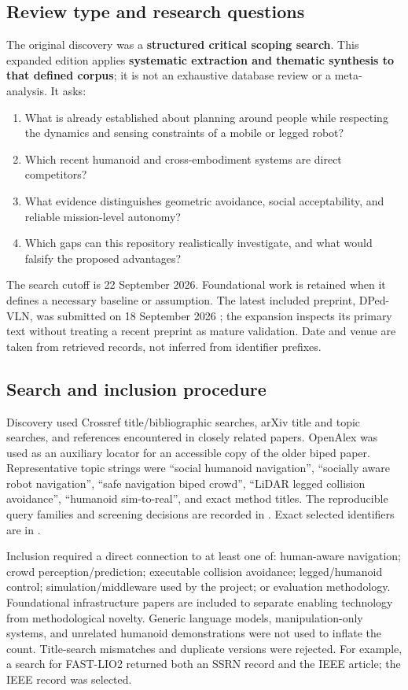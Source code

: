 \documentclass[11pt,a4paper]{article}
\newcommand{\repo}[1]{\path{#1}}
\begin{document}
\subsection{Review type and research questions}
The original discovery was a \textbf{structured critical scoping search}. This
expanded edition applies \textbf{systematic extraction and thematic synthesis to
that defined corpus}; it is not an exhaustive database review or a meta-analysis.
It asks:
\begin{enumerate}
\item What is already established about planning around people while respecting
the dynamics and sensing constraints of a mobile or legged robot?
\item Which recent humanoid and cross-embodiment systems are direct competitors?
\item What evidence distinguishes geometric avoidance, social acceptability,
and reliable mission-level autonomy?
\item Which gaps can this repository realistically investigate, and what would
falsify the proposed advantages?
\end{enumerate}

The search cutoff is 22 September 2026. Foundational work is retained when it
defines a necessary baseline or assumption. The latest included preprint,
DPed-VLN, was submitted on 18 September 2026 \citep{dped}; the expansion inspects
its primary text without treating a recent preprint as mature validation. Date and venue
are taken from retrieved records, not inferred from identifier prefixes.

\subsection{Search and inclusion procedure}
Discovery used Crossref title/bibliographic searches, arXiv title and topic
searches, and references encountered in closely related papers. OpenAlex was
used as an auxiliary locator for an accessible copy of the older biped paper.
Representative topic strings were ``social humanoid navigation'', ``socially
aware robot navigation'', ``safe navigation biped crowd'', ``LiDAR legged
collision avoidance'', ``humanoid sim-to-real'', and exact method titles.
The reproducible query families and screening decisions are recorded in
\repo{SEARCH_LOG.md}. Exact selected identifiers are in \repo{sources.json}.

Inclusion required a direct connection to at least one of: human-aware
navigation; crowd perception/prediction; executable collision avoidance;
legged/humanoid control; simulation/middleware used by the project; or
evaluation methodology. Foundational infrastructure papers are included to
separate enabling technology from methodological novelty. Generic language
models, manipulation-only systems, and unrelated humanoid demonstrations
were not used to inflate the count. Title-search mismatches and duplicate
versions were rejected. For example, a search for FAST-LIO2 returned both an
SSRN record and the IEEE article; the IEEE record was selected.
\end{document}
